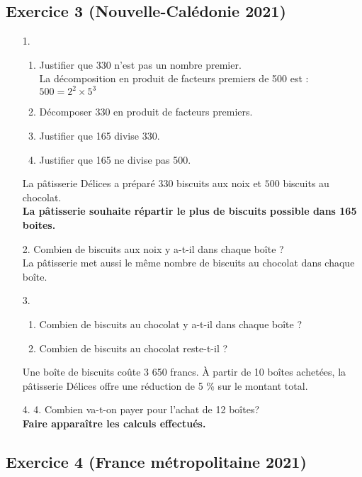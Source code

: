 \documentclass[14 pt]{extarticle}
\theoremstyle{plain}
\begin{document}
 \subsection*{Exercice 3 (Nouvelle-Calédonie 2021)}
 \begin{itemize}
 \item[1.]
 \begin{enumerate}\item Justifier que 330 n'est pas un nombre premier.\\La décomposition en produit de facteurs premiers de 500 est : $500 = 2^2\times 5^3$

 \item Décomposer 330 en produit de facteurs premiers.
 \item Justifier que 165 divise 330.
 \item Justifier que 165 ne divise pas 500.
 \end{enumerate}
 La pâtisserie Délices a préparé $330$ biscuits aux noix et $500$ biscuits au chocolat.\\
\textbf{La pâtisserie souhaite répartir le plus de biscuits possible dans 165 boites.}
 
 \item[2.] Combien de biscuits aux noix y a-t-il dans chaque boîte ?\\ 
 La pâtisserie met aussi le même nombre de biscuits au chocolat dans chaque boîte.
 
 \item[3.]\begin{enumerate}
 \item Combien de biscuits au chocolat y a-t-il dans chaque boîte ?
 \item Combien de biscuits au chocolat reste-t-il ?

 \end{enumerate}
 Une boîte de biscuits coûte 3 650 francs.
À partir de 10 boîtes achetées, la pâtisserie Délices offre une réduction de 5 \% sur le montant total.
 
 \item[4.] 4. Combien va-t-on payer pour l’achat de 12 boîtes?\\ \textbf{Faire apparaître les calculs effectués.}
 \end{itemize}
 
 \subsection*{Exercice 4 (France métropolitaine 2021)}
 
\end{document}
